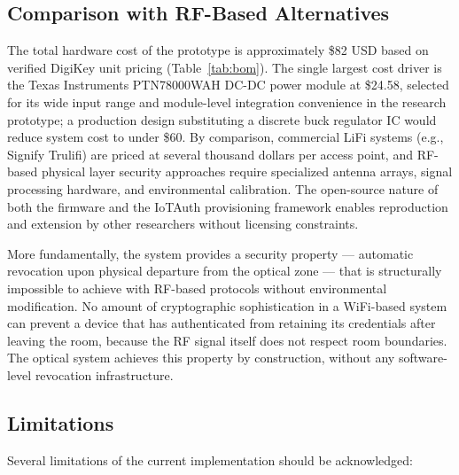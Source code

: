 \documentclass[conference]{IEEEtran}
\begin{document}
\subsection{Comparison with RF-Based Alternatives}

The total hardware cost of the prototype is approximately \$82 USD based on verified DigiKey unit pricing (Table~\ref{tab:bom}). The single largest cost driver is the Texas Instruments PTN78000WAH DC-DC power module at \$24.58, selected for its wide input range and module-level integration convenience in the research prototype; a production design substituting a discrete buck regulator IC would reduce system cost to under \$60. By comparison, commercial LiFi systems (e.g., Signify Trulifi) are priced at several thousand dollars per access point, and RF-based physical layer security approaches require specialized antenna arrays, signal processing hardware, and environmental calibration. The open-source nature of both the firmware and the IoTAuth provisioning framework enables reproduction and extension by other researchers without licensing constraints.

More fundamentally, the system provides a security property --- automatic revocation upon physical departure from the optical zone --- that is structurally impossible to achieve with RF-based protocols without environmental modification. No amount of cryptographic sophistication in a WiFi-based system can prevent a device that has authenticated from retaining its credentials after leaving the room, because the RF signal itself does not respect room boundaries. The optical system achieves this property by construction, without any software-level revocation infrastructure.

\subsection{Limitations}
\label{sec:limitations}

Several limitations of the current implementation should be acknowledged:
\end{document}
